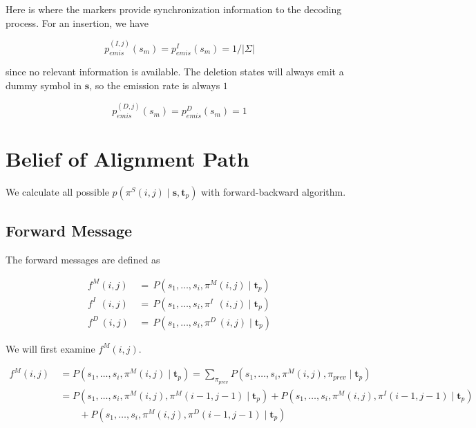 \documentclass[10pt]{article}
\begin{document}
  Here is where the markers provide synchronization information to the decoding process. For an insertion, we have

  \begin{equation}
    p_{emis}^{(I, j)}(s_m) = p_{emis}^{I}(s_m) = 1 / |\Sigma|
  \end{equation}

  since no relevant information is available. The deletion states will always emit a dummy symbol in $\mathbf{s}$, so the emission rate is always $1$

  \begin{equation}
    p_{emis}^{(D, j)}(s_m) =  p_{emis}^{D}(s_m) =  1
  \end{equation}

    
\section{Belief of Alignment Path}

  We calculate all possible $p\left(\pi^S(i, j) \;|\; \mathbf{s}, \mathbf{t}_p\right)$ with forward-backward algorithm.

  \subsection{Forward Message}
    
    The forward messages are defined as

    \begin{equation}
    \begin{aligned}
      f^{M}(i, j) \,&=\, P(s_1, \dots,s_i, \pi^M(i, j) \;|\; \mathbf{t}_{p}) \\
      f^{I\;\;}(i, j) \,&=\, P(s_1, \dots,s_i, \pi^{I\;\;}(i, j) \;|\; \mathbf{t}_{p}) \\
      f^{D\;}(i, j) \,&=\, P(s_1, \dots,s_i, \pi^{D\;}(i, j) \;|\; \mathbf{t}_{p})
    \end{aligned}
    \end{equation}

    We will first examine $f^{M}(i, j)$.

    \begin{equation} \label{eq111}
    \begin{aligned}
      f^{M}(i, j) \
        &= P(s_1, \dots,s_i, \pi^M(i, j) \;|\; \mathbf{t}_{p}) = \sum\nolimits_{\pi_{prev}} P(s_1, \dots,s_i, \pi^M(i, j), \pi_{prev} \;|\; \mathbf{t}_{p}) \\
        &= P(s_1, \dots,s_i, \pi^M(i, j), \pi^M(i-1, j-1) \;|\; \mathbf{t}_{p}) + P( s_1, \dots,s_i, \pi^M(i, j), \pi^{I}(i-1, j-1) \;|\; \mathbf{t}_{p})  \\
        &\qquad + P(s_1, \dots,s_i, \pi^M(i, j), \pi^{D}(i-1, j-1) \;|\; \mathbf{t}_{p})
    \end{aligned}
    \end{equation}
\end{document}
